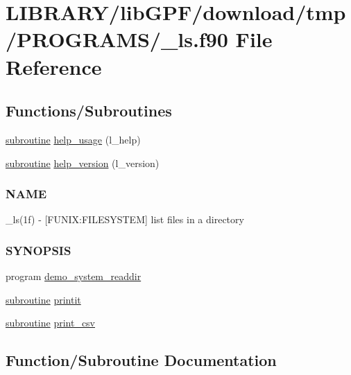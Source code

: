 \hypertarget{__ls_8f90}{}\section{L\+I\+B\+R\+A\+R\+Y/lib\+G\+P\+F/download/tmp/\+P\+R\+O\+G\+R\+A\+M\+S/\+\_\+ls.f90 File Reference}
\label{__ls_8f90}
\subsection*{Functions/\+Subroutines}
\begin{DoxyCompactItemize}
\item 
\hyperlink{M__stopwatch_83_8txt_acfbcff50169d691ff02d4a123ed70482}{subroutine} \hyperlink{__ls_8f90_a3e09a3b52ee8fb04eeb93fe5761626a8}{help\+\_\+usage} (l\+\_\+help)
\item 
\hyperlink{M__stopwatch_83_8txt_acfbcff50169d691ff02d4a123ed70482}{subroutine} \hyperlink{__ls_8f90_a39c21619b08a3c22f19e2306efd7f766}{help\+\_\+version} (l\+\_\+version)
\begin{DoxyCompactList}\small\item\em \subsubsection*{N\+A\+ME}

\+\_\+ls(1f) -\/ \mbox{[}F\+U\+N\+IX\+:F\+I\+L\+E\+S\+Y\+S\+T\+EM\mbox{]} list files in a directory \subsubsection*{S\+Y\+N\+O\+P\+S\+IS}\end{DoxyCompactList}\item 
program \hyperlink{__ls_8f90_a88c164012f5d1153e039f2dcaa76e971}{demo\+\_\+system\+\_\+readdir}
\item 
\hyperlink{M__stopwatch_83_8txt_acfbcff50169d691ff02d4a123ed70482}{subroutine} \hyperlink{__ls_8f90_a776aaa5526c5060cfed769a9836bd8da}{printit}
\item 
\hyperlink{M__stopwatch_83_8txt_acfbcff50169d691ff02d4a123ed70482}{subroutine} \hyperlink{__ls_8f90_a4299f4bb3561e562301b7fed91e7c673}{print\+\_\+csv}
\end{DoxyCompactItemize}


\subsection{Function/\+Subroutine Documentation}
\mbox{\label{__ls_8f90_a88c164012f5d1153e039f2dcaa76e971}} 
